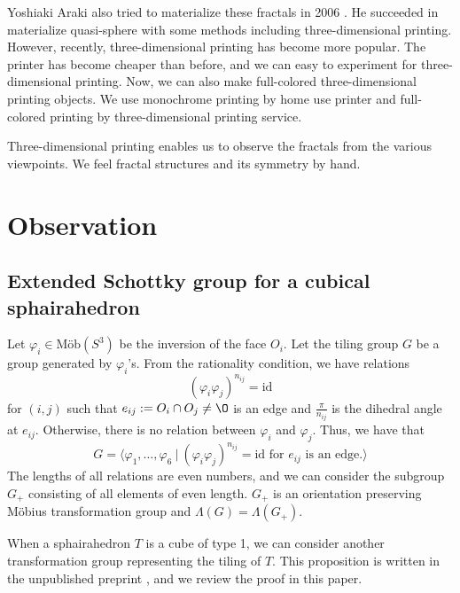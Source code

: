 \documentclass[suppldata, dvipdfmx]{interact}
\theoremstyle{plain}%
\theoremstyle{definition}
\theoremstyle{remark}
\theoremstyle{problemstyle}
\begin{document}
Yoshiaki Araki also tried to materialize these fractals in 2006
\cite{araki2006materializing}.
He succeeded in materialize quasi-sphere with some methods including
three-dimensional printing.
However, recently, three-dimensional printing has become more popular.
The printer has become cheaper than before, and we can easy to
experiment for three-dimensional printing.
Now, we can also make full-colored three-dimensional printing objects.
We use monochrome printing by home use printer and full-colored
printing by three-dimensional printing service.

Three-dimensional printing enables us to observe the fractals from the
various viewpoints.
We feel fractal structures and its symmetry by hand.

\section{Observation}

\subsection{Extended Schottky group for a cubical sphairahedron}\label{extend}

Let $\varphi_i \in \text{M\"ob}(S^3)$ be the inversion of the face $O_i$.
Let the tiling group $G$ be a group generated by $\varphi_i$'s. From the rationality condition, we
have relations
\[
 (\varphi_i \varphi_j)^{n_{ij}} = \text{id}
\]
for $(i, j)$ such that $e_{ij}:=O_i\cap O_j \neq \O$ is an edge and $\frac{\pi}{n_{ij}}$ is the dihedral angle at $e_{ij}$.  Otherwise,
there is no relation between $\varphi_i$ and $\varphi_j$.
Thus, we have that
\[
G = \langle \varphi_1, \ldots,\varphi_6~|~(\varphi_i\varphi_j)^{n_{ij}} = \text{id} \text{ for }
 e_{ij}\text{ is an edge.}\rangle
\]
The lengths of all relations are even numbers, and we can consider the subgroup $G_+$
consisting of all elements of even length.  $G_+$ is an orientation preserving M\"obius transformation group and $\Lambda(G)=\Lambda(G_+)$.

When a sphairahedron $T$ is a cube of type 1, we can consider another transformation group representing the tiling of $T$.  This proposition is written in the unpublished preprint \cite{AharaAraki2}, and we review the proof in this paper.
\end{document}
